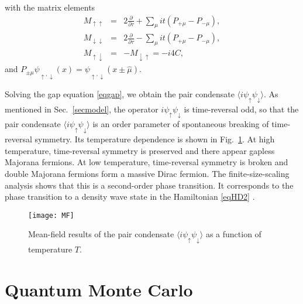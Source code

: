 \documentclass[aps,prb,superscriptaddress,twocolumn]{revtex4-1}
\newcommand{\up}{\uparrow}
\newcommand{\down}{\downarrow}
\begin{document}
with the matrix elements
\begin{eqnarray}
 M_{\uparrow\uparrow} &=& 2 \frac{\partial}{\partial\tau} + \sum_\mu  it ( P_{+\mu} - P_{-\mu} ) ,
\\
 M_{\downarrow\downarrow} &=& 2 \frac{\partial}{\partial\tau} - \sum_\mu it ( P_{+\mu} - P_{-\mu} ) ,
\\
 M_{\uparrow\downarrow} &=& - M_{\downarrow\uparrow} = - i4 C ,
\end{eqnarray}
and $P_{\pm\mu} \psi_{\up,\down}(x) = \psi_{\up,\down}(x\pm\hat{\mu})$.

Solving the gap equation \eqref{eqgap}, we obtain the pair condensate $\langle i \psi_\uparrow \psi_\downarrow \rangle$.
As mentioned in Sec.~\ref{secmodel}, the operator $i \psi_\uparrow \psi_\downarrow$ is time-reversal odd, so that the pair condensate $\langle i \psi_\uparrow \psi_\downarrow \rangle$ is an order parameter of spontaneous breaking of time-reversal symmetry.
Its temperature dependence is shown in Fig.~\ref{figMF}.
At high temperature, time-reversal symmetry is preserved and there appear gapless Majorana fermions.
At low temperature, time-reversal symmetry is broken and double Majorana fermions form a massive Dirac fermion.
The finite-size-scaling analysis shows that this is a second-order phase transition.
It corresponds to the phase transition to a density wave state in the Hamiltonian \eqref{eqHD2} \cite{PhysRevB.29.5253,PhysRevB.32.103}.

\begin{figure}[t]
 \texttt{[image: MF]}
\caption{
Mean-field results of the pair condensate $\langle i \psi_\uparrow \psi_\downarrow \rangle$ as a function of temperature $T$.
\label{figMF}
}
\end{figure}


\section{Quantum Monte Carlo}
\label{secQMC}
\end{document}

